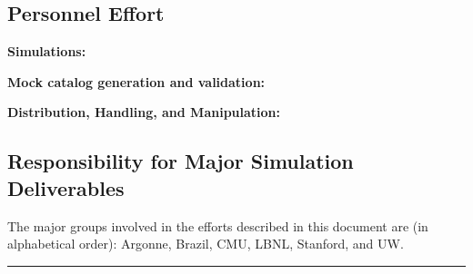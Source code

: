 \subsection{Personnel Effort}

{\bf Simulations:} 

{\bf Mock catalog generation and validation:}

{\bf Distribution, Handling, and Manipulation:}

\subsection{Responsibility for Major Simulation Deliverables}

The major groups involved in the efforts described in this document are (in alphabetical order): Argonne, Brazil, CMU, LBNL, Stanford, and UW.   


\vspace{\baselineskip}
\hrule
\clearpage
